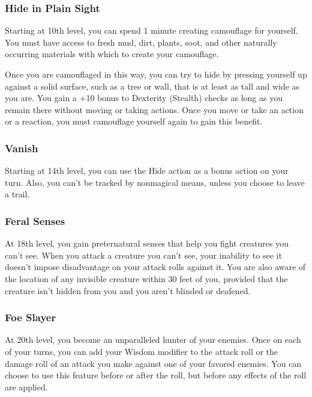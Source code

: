 \documentclass[
]{article}
\begin{document}
\hypertarget{hide-in-plain-sight}{%
\subsubsection{Hide in Plain Sight}\label{hide-in-plain-sight}}

Starting at 10th level, you can spend 1 minute creating camouflage for
yourself. You must have access to fresh mud, dirt, plants, soot, and
other naturally occurring materials with which to create your
camouflage.

Once you are camouflaged in this way, you can try to hide by pressing
yourself up against a solid surface, such as a tree or wall, that is at
least as tall and wide as you are. You gain a +10 bonus to Dexterity
(Stealth) checks as long as you remain there without moving or taking
actions. Once you move or take an action or a reaction, you must
camouflage yourself again to gain this benefit.

\hypertarget{vanish}{%
\subsubsection{Vanish}\label{vanish}}

Starting at 14th level, you can use the Hide action as a bonus action on
your turn. Also, you can't be tracked by nonmagical means, unless you
choose to leave a trail.

\hypertarget{feral-senses}{%
\subsubsection{Feral Senses}\label{feral-senses}}

At 18th level, you gain preternatural senses that help you fight
creatures you can't see. When you attack a creature you can't see, your
inability to see it doesn't impose disadvantage on your attack rolls
against it. You are also aware of the location of any invisible creature
within 30 feet of you, provided that the creature isn't hidden from you
and you aren't blinded or deafened.

\hypertarget{foe-slayer}{%
\subsubsection{Foe Slayer}\label{foe-slayer}}

At 20th level, you become an unparalleled hunter of your enemies. Once
on each of your turns, you can add your Wisdom modifier to the attack
roll or the damage roll of an attack you make against one of your
favored enemies. You can choose to use this feature before or after the
roll, but before any effects of the roll are applied.
\end{document}
